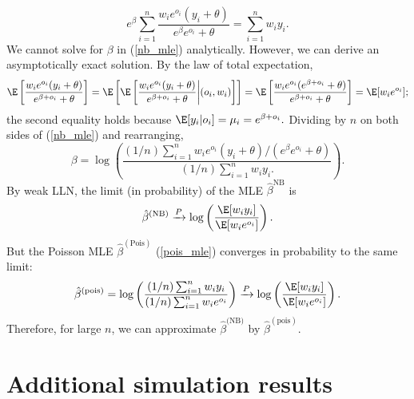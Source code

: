 \documentclass[12pt]{article}
\begin{document}
\begin{appendices}
\begin{equation}
e^\beta \sum_{i=1}^n \frac{w_i e^{o_i} (y_i + \theta)}{e^\beta e^{o_i} + \theta} = \sum_{i=1}^n w_i y_i.
\end{equation}
We cannot solve for $\beta$ in (\ref{nb_mle}) analytically. However, we can derive an asymptotically exact solution. By the law of total expectation,
$$ \E \left[\frac{w_i  e^{o_i} (y_i + \theta)}{e^{\beta + o_i} + \theta} \right] = \E \left[\E\left[\frac{w_i e^{o_i} (y_i + \theta) }{e^{\beta + o_i} + \theta} \bigg| (o_i, w_i) \right] \right] = \E \left[\frac{w_i e^{o_i} (e^{\beta + o_i} + \theta)}{ e^{\beta + o_i} + \theta} \right] = \E [w_i e^{o_i}];
$$
the second equality holds because $\E[y_i | o_i ] = \mu_i = e^{\beta + o_i}.$ Dividing by $n$ on both sides of (\ref{nb_mle}) and rearranging,
\begin{equation}\label{nb_mo_3}
\beta = \log\left( \frac{ (1/n) \sum_{i=1}^n w_i e^{o_i} (y_i + \theta)/(e^\beta e^{o_i} + \theta)}{ (1/n) \sum_{i=1}^n w_i y_i. } \right).
\end{equation}
By weak LLN, the limit (in probability) of the MLE $\hat{\beta}^\textrm{NB}$ is
\begin{equation}
\hat{\beta}^{(\textrm{NB})} \xrightarrow{P} \log\left(\frac{\E[w_i y_i]}{\E[w_i e^{o_i}]} \right).
\end{equation}
But the Poisson MLE $\hat{\beta}^{(\textrm{Pois})}$ (\ref{pois_mle}) converges in probability to the same limit:
$$ \hat{\beta}^{(\textrm{pois})} =  \log \left(\frac{ (1/n) \sum_{i=1}^n w_i y_i}{(1/n)\sum_{i=1}^n w_i e^{o_i}} \right) \xrightarrow{P} \log \left(\frac{\E[w_i y_i]}{ \E[w_i e^{o_i}]} \right).$$ Therefore, for large $n$, we can approximate $\hat{\beta}^{\textrm{(NB)}}$ by $\hat{\beta}^{(\textrm{pois})}$.

\section{Additional simulation results}

\end{appendices}


\newpage

\end{document}

